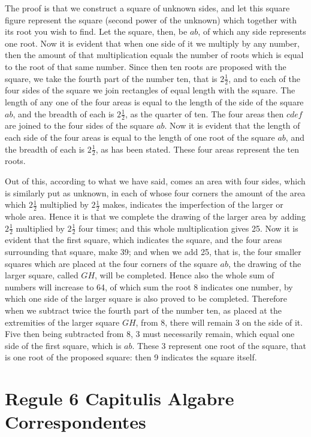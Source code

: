\documentclass[11pt,a4paper]{book}
\begin{document}
The proof is that we construct a square of unknown sides, and let this square figure represent the square (second power of the unknown) which together with its root you wish to find. Let the square, then, be $ab$, of which any side represents one root. Now it is evident that when one side of it we multiply by any number, then the amount of that multiplication equals the number of roots which is equal to the root of that same number. Since then ten roots are proposed with the square, we take the fourth part of the number ten, that is $2\frac{1}{2}$, and to each of the four sides of the square we join rectangles of equal length with the square. The length of any one of the four areas is equal to the length of the side of the square $ab$, and the breadth of each is $2\frac{1}{2}$, as the quarter of ten. The four areas then $cdef$ are joined to the four sides of the square $ab$. Now it is evident that the length of each side of the four areas is equal to the length of one root of the square $ab$, and the breadth of each is $2\frac{1}{2}$, as has been stated. These four areas represent the ten roots.

Out of this, according to what we have said, comes an area with four sides, which is similarly put as unknown, in each of whose four corners the amount of the area which $2\frac{1}{2}$ multiplied by $2\frac{1}{2}$ makes, indicates the imperfection of the larger or whole area. Hence it is that we complete the drawing of the larger area by adding $2\frac{1}{2}$ multiplied by $2\frac{1}{2}$ four times; and this whole multiplication gives 25. Now it is evident that the first square, which indicates the square, and the four areas surrounding that square, make 39; and when we add 25, that is, the four smaller squares which are placed at the four corners of the square $ab$, the drawing of the larger square, called $GH$, will be completed. Hence also the whole sum of numbers will increase to 64, of which sum the root 8 indicates one number, by which one side of the larger square is also proved to be completed. Therefore when we subtract twice the fourth part of the number ten, as placed at the extremities of the larger square $GH$, from 8, there will remain 3 on the side of it. Five then being subtracted from 8, 3 must necessarily remain, which equal one side of the first square, which is $ab$. These 3 represent one root of the square, that is one root of the proposed square: then 9 indicates the square itself.

\chapter*{Regule 6 Capitulis Algabre Correspondentes}
\end{document}
